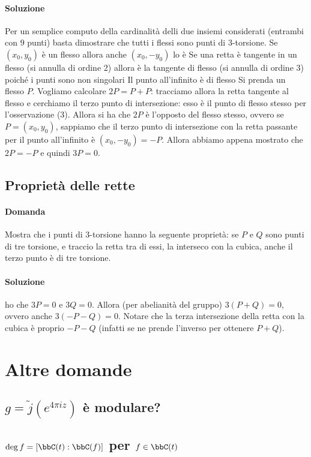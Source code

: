 \paragraph{Soluzione}
 Per un semplice computo della cardinalità delli due insiemi considerati (entrambi con $9$ punti) basta dimostrare che tutti i flessi sono punti di $3$-torsione.
 Se $(x_0, y_0)$ è un flesso allora anche $(x_0, -y_0)$ lo è
 Se una retta è tangente in un flesso (si annulla di ordine 2) allora è la tangente di flesso (si annulla di ordine 3) poiché i punti sono non singolari
 Il punto all'infinito è di flesso
 Si prenda un flesso $P$. Vogliamo calcolare $2P = P + P$: tracciamo allora la retta tangente al flesso e cerchiamo il terzo punto di intersezione: esso è il punto di flesso stesso per l'osservazione (3). Allora si ha che $2P$ è l'opposto del flesso stesso, ovvero se $P = (x_0, y_0)$, sappiamo che il terzo punto di intersezione con la retta passante per il punto all'infinito è $(x_0, -y_0) = -P$. Allora abbiamo appena mostrato che $2P = -P$ e quindi $3P = 0$.

\subsection{Proprietà delle rette}
\paragraph{Domanda} Mostra che i punti di $3$-torsione hanno la seguente proprietà: se $P$ e $Q$ sono punti di tre torsione, e traccio la retta tra di essi, la interseco con la cubica, anche il terzo punto è di tre torsione.

\paragraph{Soluzione}
 ho che $3P = 0$ e $3Q = 0$. Allora (per abelianità del gruppo) $3(P + Q) = 0$, ovvero anche $3(- P - Q) = 0$.
 Notare che la terza intersezione della retta con la cubica è proprio $- P - Q$ (infatti se ne prende l'inverso per ottenere $P + Q$).

\section{Altre domande}
\subsection{$g = \widetilde{j}(e^{4\pi i z})$ è modulare?}
\subsection{$\deg f = [\bbC(t) : \bbC(f)]$ per $f \in \bbC(t)$}


